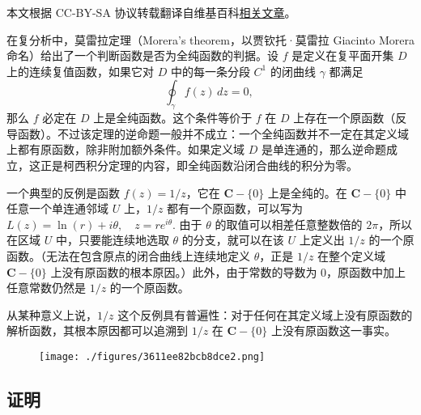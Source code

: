
本文根据 CC-BY-SA 协议转载翻译自维基百科\href{https://en.wikipedia.org/wiki/Morera\%27s_theorem}{相关文章}。

在复分析中，莫雷拉定理（Morera's theorem，以贾钦托·莫雷拉 Giacinto Morera 命名）给出了一个判断函数是否为全纯函数的判据。设 $f$ 是定义在复平面开集 $D$ 上的连续复值函数，如果它对 $D$ 中的每一条分段 $C^1$ 的闭曲线 $\gamma$ 都满足
$$
\oint_{\gamma} f(z)\,dz = 0,~
$$
那么 $f$ 必定在 $D$ 上是全纯函数。这个条件等价于 $f$ 在 $D$ 上存在一个原函数（反导函数）。不过该定理的逆命题一般并不成立：一个全纯函数并不一定在其定义域上都有原函数，除非附加额外条件。如果定义域 $D$ 是单连通的，那么逆命题成立，这正是柯西积分定理的内容，即全纯函数沿闭合曲线的积分为零。

一个典型的反例是函数 $f(z) = 1/z$，它在 $\mathbf{C} - \{0\}$ 上是全纯的。在 $\mathbf{C} - \{0\}$ 中任意一个单连通邻域 $U$ 上，$1/z$ 都有一个原函数，可以写为$L(z) = \ln(r) + i\theta, \quad z = re^{i\theta}$.
由于 $\theta$ 的取值可以相差任意整数倍的 $2\pi$，所以在区域 $U$ 中，只要能连续地选取 $\theta$ 的分支，就可以在该 $U$ 上定义出 $1/z$ 的一个原函数。（无法在包含原点的闭合曲线上连续地定义 $\theta$，正是 $1/z$ 在整个定义域 $\mathbf{C} - \{0\}$ 上没有原函数的根本原因。）此外，由于常数的导数为 0，原函数中加上任意常数仍然是 $1/z$ 的一个原函数。

从某种意义上说，$1/z$ 这个反例具有普遍性：对于任何在其定义域上没有原函数的解析函数，其根本原因都可以追溯到 $1/z$ 在 $\mathbf{C} - \{0\}$ 上没有原函数这一事实。
\begin{figure}[ht]
\centering
\texttt{[image: ./figures/3611ee82bcb8dce2.png]}
\caption{} \label{fig_MLLdl_1}
\end{figure}
\subsection{证明}